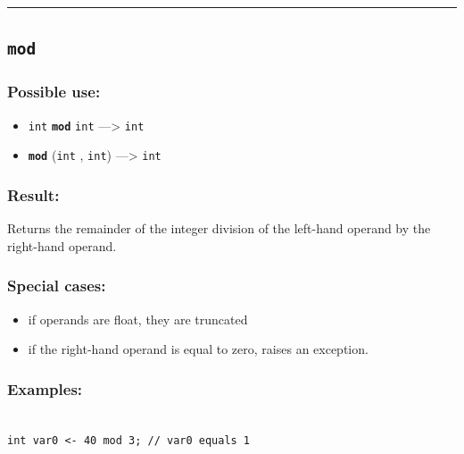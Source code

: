 \documentclass[]{book}
\providecommand{\tightlist}{%
  \setlength{\itemsep}{0pt}\setlength{\parskip}{0pt}}
\theoremstyle{definition}
\theoremstyle{definition}
\theoremstyle{definition}
\theoremstyle{remark}
\begin{document}
\begin{center}\rule{0.5\linewidth}{\linethickness}\end{center}

\subsection{\texorpdfstring{\texttt{mod}}{mod}}\label{mod}

\subsubsection{Possible use:}\label{possible-use-360}

\begin{itemize}
\tightlist
\item
  \texttt{int} \textbf{\texttt{mod}} \texttt{int} ---\textgreater{}
  \texttt{int}
\item
  \textbf{\texttt{mod}} (\texttt{int} , \texttt{int}) ---\textgreater{}
  \texttt{int}
\end{itemize}

\subsubsection{Result:}\label{result-349}

Returns the remainder of the integer division of the left-hand operand
by the right-hand operand.

\subsubsection{Special cases:}\label{special-cases-100}

\begin{itemize}
\tightlist
\item
  if operands are float, they are truncated\\
\item
  if the right-hand operand is equal to zero, raises an exception.
\end{itemize}

\subsubsection{Examples:}\label{examples-250}

\begin{verbatim}
 
int var0 <- 40 mod 3; // var0 equals 1
\end{verbatim}
\end{document}
